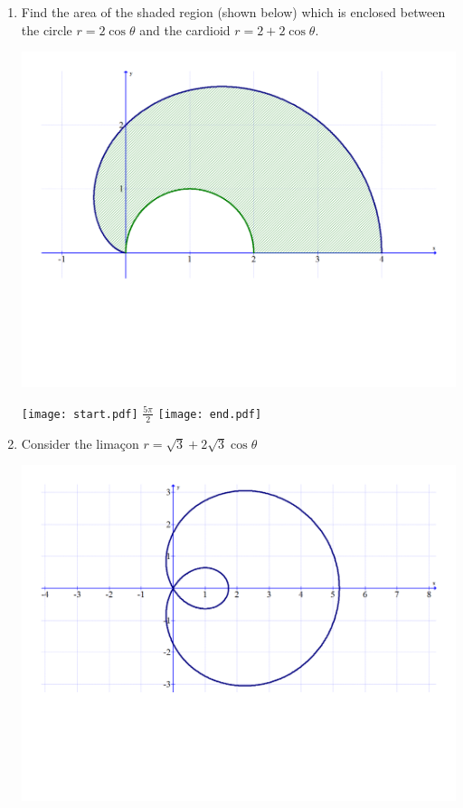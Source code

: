 \documentclass[12pt]{article}
\begin{document}
\begin{enumerate}
\item Find the area of the shaded region (shown below) which is enclosed between the circle $r=2\cos{\theta}$ and the cardioid $r=2+2\cos{\theta}$.

\begin{center}
\includegraphics[scale=0.4]{area.pdf}
\end{center}

\texttt{[image: start.pdf]}
{{$\frac{5\pi}{2}$}}
\texttt{[image: end.pdf]}


\item Consider the lima\c{c}on $r=\sqrt{3}+2\sqrt{3}\cos{\theta}$

\begin{center}
\includegraphics[scale=0.5]{limacon}
\end{center}


\end{enumerate}
\end{document}
